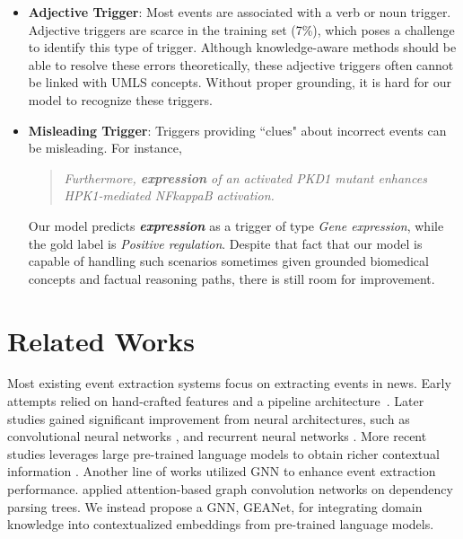 \documentclass[11pt,a4paper]{article}
\makeatletter
\newcommand{\GAENet}{\textrm{GEANet}}
\renewcommand\paragraph{\@startsection{paragraph}{4}{\z@}{.25ex \@plus.5ex \@minus.2ex}{-1em}{\normalfont\normalsize\bfseries}}
\makeatother
\begin{document}
\begin{itemize}

  \item \textbf{Adjective Trigger}: Most events are associated with a verb or noun trigger. Adjective triggers are scarce in the training set (7\%), which poses a challenge to identify this type of trigger. Although knowledge-aware methods should be able to resolve these errors theoretically, these adjective triggers often cannot be linked with UMLS concepts. Without proper grounding, it is hard for our model to recognize these triggers.
  \item \textbf{Misleading Trigger}: Triggers providing ``clues" about incorrect events can be misleading. For instance, \begin{quote}
      
  \textit{Furthermore, \textbf{expression} of an activated PKD1 mutant enhances HPK1-mediated NFkappaB activation.} \end{quote}
  Our model predicts \textit{\textbf{expression}} as a trigger of type \textit{Gene expression}, while the gold label is \textit{Positive regulation}. Despite that fact that our model is capable of handling such scenarios sometimes given grounded biomedical concepts and factual reasoning paths, there is still room for improvement. 
\end{itemize}



 \section{Related Works}
\paragraph{Event Extraction} Most existing event extraction systems focus on extracting events in news. Early attempts relied on hand-crafted features and a pipeline architecture~\cite{gupta-ji-2009-predicting, li-etal-2013-joint}. Later studies gained significant improvement from neural architectures, such as convolutional neural networks \cite{chen-etal-2015-event, nguyen-grishman-2015-event}, and recurrent neural networks \cite{nguyen-etal-2016-joint}. More recent studies leverages large pre-trained language models to obtain richer contextual information \cite{wadden-etal-2019-entity, lin-etal-2020-joint}. Another line of works utilized GNN to enhance event extraction performance.  applied attention-based graph convolution networks on dependency parsing trees. We instead propose a GNN, \GAENet, for integrating domain knowledge into contextualized embeddings from pre-trained language models.
\end{document}
